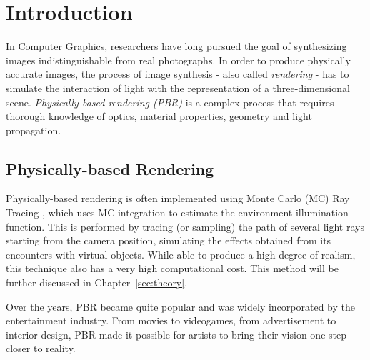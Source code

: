 \chapter{Introduction}
\label{sec:intro}

In Computer Graphics, 
researchers  have long pursued the goal of synthesizing images indistinguishable 
from real photographs. In order to produce physically accurate images, the 
process of image synthesis - also called \textit{rendering} - has to simulate the 
interaction of light with the representation of a three-dimensional scene. 
%
\textit{Physically-based rendering (PBR)} is a complex process that requires 
thorough knowledge of optics, material properties, geometry and light 
propagation.


\section{Physically-based Rendering}
Physically-based rendering is often implemented using Monte Carlo (MC) Ray Tracing \cite{Lafortune96mathematicalmodels}, which uses MC 
integration \cite{Keller:200} to estimate the environment illumination function. 
This is performed by tracing (or sampling) the path of several light rays starting from the camera position, simulating the effects obtained from its encounters with virtual objects. 
%
While able to produce a high degree of realism, this technique also has a very 
high computational cost. This method will be further discussed in Chapter~\ref{sec:theory}.

Over the years, PBR became quite popular and was widely incorporated by the 
entertainment industry. From movies to videogames, from advertisement to interior 
design, PBR made it possible for artists to bring their 
vision one step closer to reality. 

